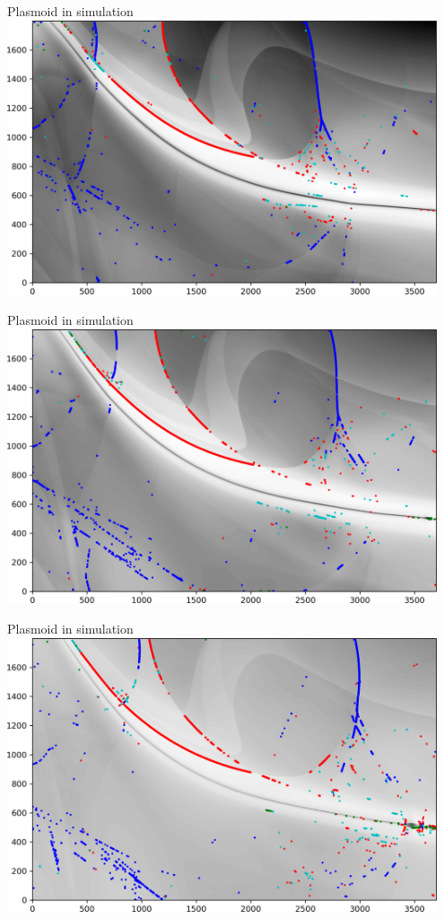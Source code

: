 \documentclass[10pt,aspectratio=169,usenames,dvipsnames]{beamer}
\begin{document}
\begin{frame}{Plasmoid in simulation}
\includegraphics[width=0.95\textwidth]{2023NAM/Figures/shocks60.png}
\end{frame}
\begin{frame}{Plasmoid in simulation}
\includegraphics[width=0.95\textwidth]{2023NAM/Figures/shocks61.png}
\end{frame}
\begin{frame}{Plasmoid in simulation}
\includegraphics[width=0.95\textwidth]{2023NAM/Figures/shocks62.png}
\end{frame}
\end{document}
